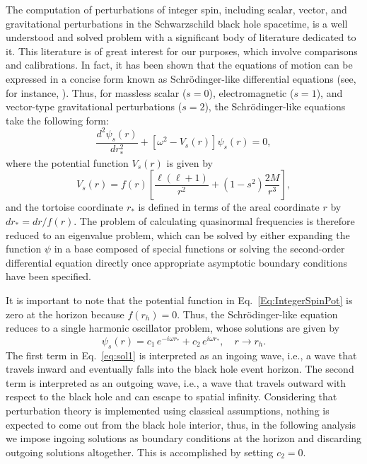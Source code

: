 The computation of perturbations of integer spin, including scalar, vector, and gravitational perturbations in the Schwarzschild black hole spacetime, is a well understood and solved problem with a significant body of literature dedicated to it. This literature is of great interest for our purposes, which involve comparisons and calibrations. In fact, it has been shown that the equations of motion can be expressed in a concise form known as Schrödinger-like differential equations (see, for instance, \cite{review3}). Thus, for massless scalar ($s=0$), electromagnetic ($s=1$), and vector-type gravitational perturbations ($s=2$), the Schrödinger-like equations take the following form:
%
\begin{equation}\label{Eq:IntegerSpin}
  \frac{d^2 \psi_{{s}}(r)}{d r_*^2}
  +\left[\omega^2-V_{{s}}(r)\right]\psi_{{s}}(r)=0,
\end{equation}
%
where the potential function $V_{s}(r)$ is given by
%
\begin{equation}\label{Eq:IntegerSpinPot}
  V_{s}(r)=f(r)\left[\frac{\ell\left(\ell+1\right)}{r^2}
    +\left(1-s^2\right)\frac{2M}{r^3}\right],
\end{equation}
%
and the tortoise coordinate $r_*$ is defined in terms of the areal coordinate $r$ by $dr_*=dr/f(r)$. The problem of calculating quasinormal frequencies is therefore reduced to an eigenvalue problem, which can be solved by either expanding the function $\psi$ in a base composed of special functions or solving the second-order differential equation directly once appropriate asymptotic boundary conditions have been specified.

It is important to note that the potential function in Eq.~\eqref{Eq:IntegerSpinPot} is zero at the horizon because $f(r_h)=0$. Thus, the Schr\"odinger-like equation reduces to a single harmonic oscillator problem, whose solutions are given by
%
\begin{equation}
  \psi_{s}(r)=c_1\, e^{-i\omega r_*}+c_2\, e^{i\omega r_*}, \quad r\to r_h.
  \label{eq:sol1}
\end{equation}
%
The first term in Eq.~\eqref{eq:sol1} is interpreted as an ingoing wave, i.e., a wave that travels inward and eventually falls into the black hole event horizon. The second term is interpreted as an outgoing wave, i.e., a wave that travels outward with respect to the black hole and can escape to spatial infinity. Considering that perturbation theory is implemented using classical assumptions, nothing is expected to come out from the black hole interior, thus, in the following analysis we impose ingoing solutions as boundary conditions at the horizon and discarding outgoing solutions altogether. This is accomplished by setting  $c_2=0$.

